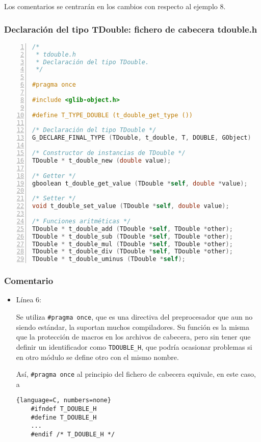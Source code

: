 Los comentarios se centrarán en los cambios con respecto al ejemplo 8.


\subsubsection{Declaración del tipo \textsf{TDouble}: fichero de cabecera \textsf{tdouble.h}}

\begin{lstlisting}[language=C, numbers=left]
/*
 * tdouble.h
 * Declaración del tipo TDouble.
 */

#pragma once

#include <glib-object.h>

#define T_TYPE_DOUBLE (t_double_get_type ())

/* Declaración del tipo TDouble */
G_DECLARE_FINAL_TYPE (TDouble, t_double, T, DOUBLE, GObject)

/* Constructor de instancias de TDouble */
TDouble * t_double_new (double value);

/* Getter */
gboolean t_double_get_value (TDouble *self, double *value);

/* Setter */
void t_double_set_value (TDouble *self, double value);
  
/* Funciones aritméticas */
TDouble * t_double_add (TDouble *self, TDouble *other);
TDouble * t_double_sub (TDouble *self, TDouble *other);
TDouble * t_double_mul (TDouble *self, TDouble *other);
TDouble * t_double_div (TDouble *self, TDouble *other);
TDouble * t_double_uminus (TDouble *self);
\end{lstlisting}

\subsubsection{Comentario}
\begin{itemize}
\item Línea 6:\par
  Se utiliza \texttt{\#pragma once}, que es una directiva del preprocesador que aun no
  siendo estándar, la suportan muchos compiladores. Su función es la misma que la
  protección de macros en los archivos de cabecera, pero sin tener que definir un
  identificador como \texttt{TDOUBLE\_H}, que podría ocasionar problemas si en otro
  módulo se define otro con el mismo nombre.

  Así, \texttt{\#pragma once} al principio del fichero de cabecera equivale, en este
  caso, a 
  \begin{lstlisting}{language=C, numbers=none}
    #ifndef T_DOUBLE_H
    #define T_DOUBLE_H
    ...
    #endif /* T_DOUBLE_H */
  \end{lstlisting}
\end{itemize}


